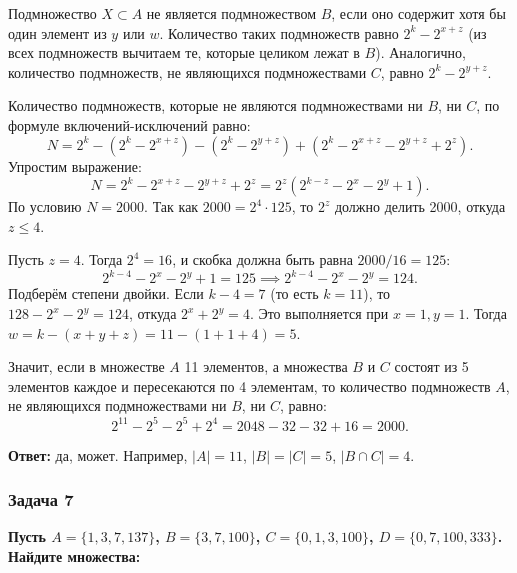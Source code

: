 \documentclass[12pt, a4paper]{article}
\begin{document}
Подмножество \(X \subset A\) не является подмножеством \(B\), если оно содержит хотя бы один элемент из \(y\) или \(w\). 
Количество таких подмножеств равно \(2^k - 2^{x+z}\) (из всех подмножеств вычитаем те, которые целиком лежат в \(B\)).
Аналогично, количество подмножеств, не являющихся подмножествами \(C\), равно \(2^k - 2^{y+z}\).

Количество подмножеств, которые не являются подмножествами ни \(B\), ни \(C\), по формуле включений-исключений равно:
\[
N = 2^k - (2^k - 2^{x+z}) - (2^k - 2^{y+z}) + (2^k - 2^{x+z} - 2^{y+z} + 2^z).
\]
Упростим выражение:
\[
N = 2^k - 2^{x+z} - 2^{y+z} + 2^z = 2^z(2^{k-z} - 2^x - 2^y + 1).
\]
По условию \(N = 2000\). Так как \(2000 = 2^4 \cdot 125\), то \(2^z\) должно делить 2000, откуда \(z \le 4\).

Пусть \(z=4\). Тогда \(2^4 = 16\), и скобка должна быть равна \(2000/16 = 125\):
\[
2^{k-4} - 2^x - 2^y + 1 = 125 \implies 2^{k-4} - 2^x - 2^y = 124.
\]
Подберём степени двойки. Если \(k-4 = 7\) (то есть \(k=11\)), то \(128 - 2^x - 2^y = 124\), откуда \(2^x + 2^y = 4\). Это выполняется при \(x=1, y=1\).
Тогда \(w = k - (x+y+z) = 11 - (1+1+4) = 5\).

Значит, если в множестве \(A\) 11 элементов, а множества \(B\) и \(C\) состоят из 5 элементов каждое и пересекаются по 4 элементам, то количество подмножеств \(A\), не являющихся подмножествами ни \(B\), ни \(C\), равно:
\[
2^{11} - 2^5 - 2^5 + 2^4 = 2048 - 32 - 32 + 16 = 2000.
\]

\textbf{Ответ:} да, может. Например, \(|A|=11\), \(|B|=|C|=5\), \(|B \cap C|=4\).

\subsubsection*{Задача 7}
\textbf{Пусть \(A = \{1, 3, 7, 137\}\), \(B = \{3, 7, 100\}\), \(C = \{0, 1, 3, 100\}\), \(D = \{0, 7, 100, 333\}\). Найдите множества:}
\end{document}

